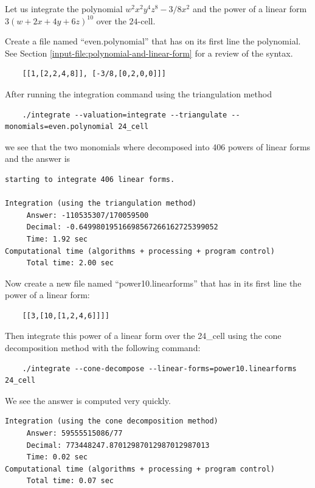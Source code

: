 \documentclass{article}
\begin{document}
Let us integrate the polynomial $w^2x^2y^4z^8 -3/8x^2$ and the power of a linear form $3(w +2x + 4y + 6z)^{10}$ over the $24$-cell.

 

Create a file named ``even.polynomial'' that has on its first line the polynomial. See Section \ref{input-file:polynomial-and-linear-form} for a review of the syntax.
	
	\begin{verbatim}
	[[1,[2,2,4,8]], [-3/8,[0,2,0,0]]]
	\end{verbatim}

After running the integration command using the triangulation method
	\begin{verbatim}
	./integrate --valuation=integrate --triangulate --monomials=even.polynomial 24_cell
	\end{verbatim}


we see that the two monomials where decomposed into 406 powers of linear forms and the answer is


\begin{verbatim}
starting to integrate 406 linear forms.

Integration (using the triangulation method)
     Answer: -110535307/170059500
     Decimal: -0.64998019516698567266162725399052
     Time: 1.92 sec
Computational time (algorithms + processing + program control)
     Total time: 2.00 sec
\end{verbatim}



Now create a new file named ``power10.linearforms'' that has in its first line the power of a linear form:

	\begin{verbatim}
	[[3,[10,[1,2,4,6]]]]
	\end{verbatim}
	
Then integrate this power of a linear form over the 24\_cell using the cone decomposition method with the following command:	
	\begin{verbatim}
	./integrate --cone-decompose --linear-forms=power10.linearforms  24_cell
	\end{verbatim}
	
We see the answer is computed very quickly.
	
\begin{verbatim}	
Integration (using the cone decomposition method)
     Answer: 59555515086/77
     Decimal: 773448247.87012987012987012987013
     Time: 0.02 sec
Computational time (algorithms + processing + program control)
     Total time: 0.07 sec
\end{verbatim}	
	
\end{document}
